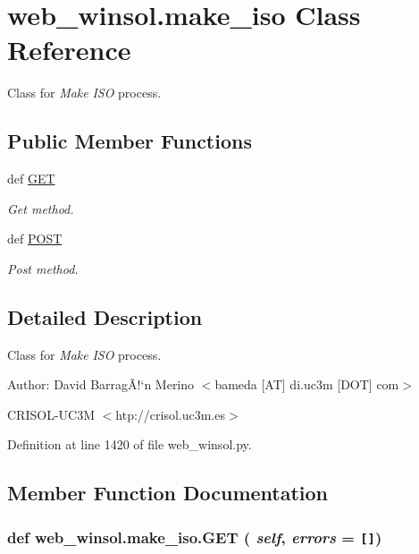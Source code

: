 \hypertarget{classweb__winsol_1_1make__iso}{
\section{web\_\-winsol.make\_\-iso Class Reference}
\label{classweb__winsol_1_1make__iso}
}
Class for {\em Make\/} {\em ISO\/} process.  


\subsection*{Public Member Functions}
\begin{CompactItemize}
\item 
def \hyperlink{classweb__winsol_1_1make__iso_1401daa59e75c202176cc6212f7586c6}{GET}
\begin{CompactList}\small\item\em Get method. \item\end{CompactList}\item 
def \hyperlink{classweb__winsol_1_1make__iso_107bb45348816c5fca668a244f05a0e8}{POST}
\begin{CompactList}\small\item\em Post method. \item\end{CompactList}\end{CompactItemize}


\subsection{Detailed Description}
Class for {\em Make\/} {\em ISO\/} process. 

\begin{Desc}
\item[Author:]David Barrag\~{A}!`n Merino $<$bameda \mbox{[}AT\mbox{]} di.uc3m \mbox{[}DOT\mbox{]} com$>$ 

CRISOL-UC3M $<$htp://crisol.uc3m.es$>$ \end{Desc}




Definition at line 1420 of file web\_\-winsol.py.

\subsection{Member Function Documentation}
\hypertarget{classweb__winsol_1_1make__iso_1401daa59e75c202176cc6212f7586c6}{
\subsubsection[GET]{\setlength{\rightskip}{0pt plus 5cm}def web\_\-winsol.make\_\-iso.GET ( {\em self},  {\em errors} = {\tt \mbox{[}\mbox{]}})}}
\label{classweb__winsol_1_1make__iso_1401daa59e75c202176cc6212f7586c6}


